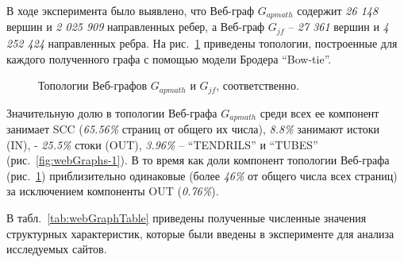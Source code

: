 В ходе эксперимента было выявлено, что Веб-граф \(G_{apmath}\) содержит \textit{26 148} вершин и \textit{2 025 909} направленных ребер, а Веб-граф \(G_{jf}\) -- \textit{27 361} вершин и \textit{4 252 424} направленных ребра. На рис.~\cref{fig:webGraphs} приведены топологии, построенные для каждого полученного графа с помощью модели Бродера “Bow-tie”.

\begin{figure}[ht]
    \caption{Топологии Веб-графов \(G_{apmath}\) и \(G_{jf}\), соответственно.}\label{fig:webGraphs}
\end{figure}

Значительную долю в топологии Веб-графа \(G_{apmath}\) среди всех ее компонент занимает SCC (\textit{65.56\%} страниц от общего их числа), \textit{8.8\%} занимают истоки (IN), - \textit{25.5\%} стоки (OUT), \textit{3.96\%} -- “TENDRILS” и “TUBES” (рис.~\cref{fig:webGraphs-1}). В то время как доли компонент топологии Веб-графа (рис.~\cref{fig:webGraphs}) приблизительно одинаковые (более \textit{46\%} от общего числа всех страниц) за исключением компоненты OUT (\textit{0.76\%}).

В табл.~\cref{tab:webGraphTable} приведены полученные численные значения структурных характеристик, которые были введены в эксперименте для анализа исследуемых сайтов.

